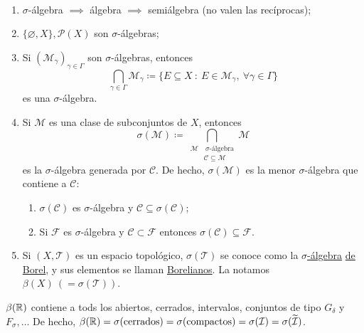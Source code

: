 \documentclass[a4paper]{report}
\begin{document}
	\begin{eg}~
		\begin{enumerate}
			\item $\sigma$-álgebra $\implies$ álgebra $\implies$ semiálgebra (no valen las recíprocas);

			\item $\{\varnothing,X\},\mathcal{P}(X)$ son $\sigma$-álgebras;

			\item Si $(\mathscr{M}_{\gamma})_{\gamma \in \Gamma}$ son $\sigma$-álgebras, entonces
			\[ \displaystyle\bigcap_{\gamma\in\Gamma} \mathscr{M}_{\gamma} \coloneq \{ E \subseteq X \ : \ E \in \mathscr{M}_{\gamma},\ \forall \gamma \in \Gamma \} \]
			es una $\sigma$-álgebra.
			
			\item Si $\mathscr{M}$ es una clase de subconjuntos de $X$, entonces
			\[ \sigma(\mathscr{M}) \coloneq \displaystyle\bigcap_{\begin{aligned}
				\mathscr{M}& \ \sigma\text{-álgebra} \\
				& \mathscr{C}\subseteq\mathscr{M}
			\end{aligned}} \mathscr{M} \]
			es la $\sigma$-álgebra generada por $\mathscr{C}$. De hecho, $\sigma(\mathscr{M})$ es la menor $\sigma$-álgebra que contiene a $\mathscr{C}$:
			\begin{enumerate}
				\item $\sigma(\mathscr{C})$ es $\sigma$-álgebra y $\mathscr{C} \subseteq \sigma(\mathscr{C})$;

				\item Si $\mathscr{F}$ es $\sigma$-álgebra y $\mathscr{C} \subset \mathscr{F}$ entonces $\sigma(\mathscr{C}) \subseteq \mathscr{F}$.
			\end{enumerate}

			\item Si $(X,\mathscr{T})$ es un espacio topológico, $\sigma(\mathscr{T})$ se conoce como la \underline{$\sigma$-álgebra} \underline{de Borel}, y sus elementos se llaman \underline{Borelianos}. La notamos $\beta(X)\ (= \sigma(\mathscr{T}))$.
		\end{enumerate}
	\end{eg}
	
	\begin{eg}
		$\beta(\mathbb{R})$ contiene a tods los abiertos, cerrados, intervalos, conjuntos de tipo $G_{\delta}$ y $F_{\sigma},\dots$ De hecho, $\beta(\mathbb{R})=\sigma(\text{cerrados})=\sigma(\text{compactos})=\sigma(\mathcal{I})=\sigma(\widetilde{\mathcal{I}})$.
	\end{eg}
\end{document}
